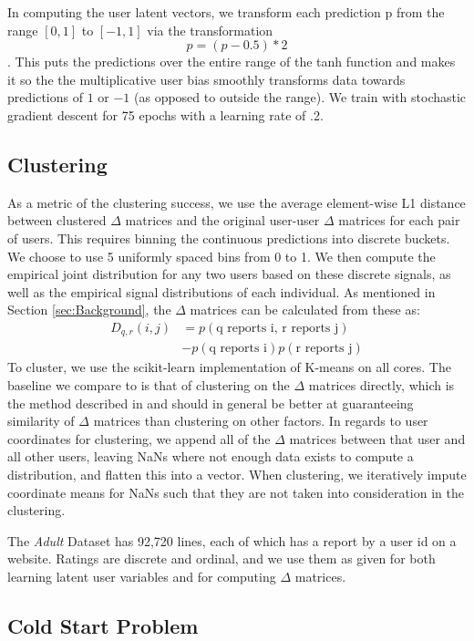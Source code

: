\documentclass{article}
\begin{document}
In computing the user latent vectors, we transform each prediction p from the range $[0,1]$ to $[-1, 1]$ via the transformation $$p = (p - 0.5) * 2$$. This puts the predictions over the entire range of the tanh function and makes it so the the multiplicative user bias smoothly transforms data towards predictions of $1$ or $-1$ (as opposed to outside the range). We train with stochastic gradient descent for 75 epochs with a learning rate of .2. 

\subsection{Clustering} As a metric of the clustering success, we use the average element-wise L1 distance between clustered $\Delta$ matrices and the original user-user $\Delta$ matrices for each pair of users. This requires binning the continuous predictions into discrete buckets. We choose to use 5 uniformly spaced bins from 0 to 1. We then compute the empirical joint distribution for any two users based on these discrete signals, as well as the empirical signal distributions of each individual. As mentioned in Section \ref{sec:Background}, the $\Delta$ matrices can be calculated from these as:
\begin{align*}
D_{q,r}(i,j) &= p(\textrm{q reports i, r reports j}) \\
&- p(\textrm{q reports i})p(\textrm{r reports j})
\end{align*}
To cluster, we use the scikit-learn implementation of K-means on all cores. The baseline we compare to is that of clustering on the $\Delta$ matrices directly, which is the method described in \citet{agarwal2017} and should in general be better at guaranteeing similarity of $\Delta$ matrices than clustering on other factors. In regards to user coordinates for clustering, we append all of the $\Delta$ matrices between that user and all other users, leaving NaNs where not enough data exists to compute a distribution, and flatten this into a vector. When clustering, we iteratively impute coordinate means for NaNs such that they are not taken into consideration in the clustering. 

The \emph{Adult} Dataset has 92,720 lines, each of which has a report by a user id on a website. Ratings are discrete and ordinal, and we use them as given for both learning latent user variables and for computing $\Delta$ matrices.

\subsection{Cold Start Problem}
\end{document}
